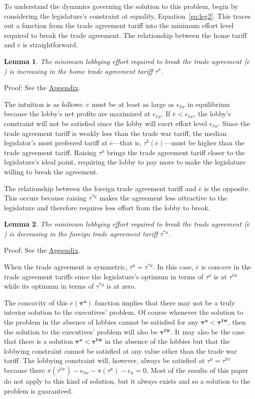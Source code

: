 \documentclass[authoryear, review]{elsarticle}
\newtheorem{lemma}{Lemma}
\newcommand{\ov}{\overline}
\newcommand{\bta}{\bm{\tau^a}}
\newcommand{\btw}{\bm{\tau^{tw}}}
\begin{document}
To understand the dynamics governing the solution to this problem, begin by considering the legislature's constraint at equality, Equation~\ref{eq:leg2}. This traces out a function from the trade agreement tariff into the minimum effort level required to break the trade agreement. The relationship between the home tariff and $\ov{e}$ is straightforward. 
\begin{lemma}
  The minimum lobbying effort required to break the trade agreement ($\ov{e}$) is increasing in the home trade agreement tariff $\tau^a$.
  \label{lem:et}
\end{lemma}
Proof: See the \hyperlink{Cor_et}{Appendix}.

\noindent The intuition is as follows: $\ov{e}$ must be at least as large as $e_{tw}$ in equilibrium because the lobby's net profits are maximized at $e_{tw}$. If $\ov{e} < e_{tw}$, the lobby's constraint will not be satisfied since the lobby will exert effort level $e_{tw}$. Since the trade agreement tariff is weakly less than the trade war tariff, the median legislator's most preferred tariff at $\ov{e}$---that is, $\tau^b\left(\ov{e}\right)$---must be higher than the trade agreement tariff. Raising $\tau^a$ brings the trade agreement tariff closer to the legislature's ideal point, requiring the lobby to pay more to make the legislature willing to break the agreement.

The relationship between the foreign trade agreement tariff and $\ov{e}$ is the opposite. This occurs because raising $\tau^{*a}$ makes the agreement less attractive to the legislature and therefore requires less effort from the lobby to break.
\begin{lemma}
  The minimum lobbying effort required to break the trade agreement ($\ov{e}$) is decreasing in the foreign trade agreement tariff $\tau^{*a}$.
  \label{lem:ets}
\end{lemma}
Proof: See the \hyperlink{Lem_ets}{Appendix}.

When the trade agreement is symmetric, $\tau^a = \tau^{*a}$. In this case, $\ov{e}$ is concave in the trade agreement tariffs since the legislature's optimum in terms of $\tau^a$ is at $\tau^{tw}$ while its optimum in terms of $\tau^{*a}$ is at zero.

The concavity of this $\ov{e}(\bta)$ function implies that there may not be a truly interior solution to the executives' problem. Of course whenever the solution to the problem in the absence of lobbies cannot be satisfied for any $\bta < \btw$, then the solution to the executives' problem will also be $\btw$. It may also be the case that there is a solution $\bta < \btw$ in the absence of the lobbies but that the lobbying constraint cannot be satisfied at any value other than the trade war tariff. The lobbying constraint will, however, always be satisfied at $\tau^a = \tau^{tw}$ because there $\pi(\tau^{tw}) -e_{tw} - \pi(\tau^a) - e_a =0$. Most of the results of this paper do not apply to this kind of solution, but it always exists and so a solution to the problem is guaranteed.
\end{document}
